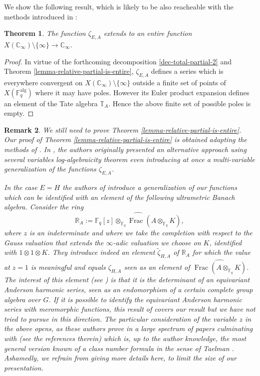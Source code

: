 \documentclass[11pt]{amsart}
\numberwithin{equation}{section}
\newcommand{\FF}{\mathbb{F}}
\newcommand{\CC}{\mathbb{C}}
\newcommand{\TT}{\mathbb{T}}
\newtheorem{Theorem}{Theorem}[section]
\newtheorem{Remark}[Theorem]{Remark}
\begin{document}
We show the following result, which is likely to be also reacheable with the methods introduced in \cite[\S 4.2]{ANG&NGO&TAV}:

\begin{Theorem}\label{zeta-E-A-are-entire}
The function $\zeta_{E,A}$ extends to an entire function $X(\CC_\infty)\setminus\{\infty\}\rightarrow\CC_\infty$.
\end{Theorem}


\begin{proof}%
In virtue of the forthcoming decomposition \eqref{dec-total-partial-2} and Theorem \ref{lemma-relative-partial-is-entire}, $\zeta_{E,A}$ defines a series which is everywhere convergent on $X(\CC_\infty)\setminus\{\infty\}$ outside a finite set of points of
$X(\FF_q^{\text{alg}})$ where it may have poles. However its Euler product expansion defines an element of the Tate algebra $\TT_A$. Hence the above finite set of possible poles is empty.
\end{proof}

\begin{Remark}{\em 
We still need to prove Theorem \ref{lemma-relative-partial-is-entire}. Our proof of
Theorem \ref{lemma-relative-partial-is-entire} is obtained adapting the methods of \cite[\S 8.9]{GOS}.
In \cite[\S 4.2]{ANG&NGO&TAV}, the authors originally presented an alternative approach using several variables log-algebraicity theorem even introducing at once a multi-variable generalization of the functions $\zeta_{E,A}$. 

In the case $E=H$ the authors of \cite{ANG&NGO&TAV} introduce a generalization of our functions which can be identified with an element of the following ultrametric Banach algebra. Consider the ring $$\mathbb{R}_{A}:=\widehat{\FF_q[z]\otimes_{\FF_q}\operatorname{Frac}(A\otimes_{\FF_q}K)},$$ where $z$ is an indeterminate and where we take the completion with respect to the Gauss valuation that extends the $\infty$-adic valuation we choose on $K$, identified with $1\otimes1\otimes K$. They introduce indeed an element $\tilde{\zeta}_{H,A}$ of $\mathbb{R}_{A}$ for which the value at $z=1$ is meaningful and equals $\zeta_{H,A}$ seen as an element of 
$\widehat{\operatorname{Frac}(A\otimes_{\FF_q}K)}$. The interest of this element (see \cite[Proposition 4.7]{ANG&NGO&TAV}) is that it is the determinant of an {\em equivariant Anderson harmonic series}, seen as an endomorphism of a certain complete group algebra over $G$. If it is possible to identify the equivariant Anderson harmonic series with meromorphic functions, this result of 
\cite{ANG&NGO&TAV} covers our result but we have not tried to pursue in this direction. The particular consideration of the variable $z$ in the above opens, as these authors prove in a large spectrum of papers culminating with \cite{ANG&NGO&TAV3} (see the references therein) which is, up to the author knowledge, the most general version known of a class number formula in the sense of Taelman \cite{TAE}. Ashamedly, we refrain from giving more details here,
to limit the size of our presentation.
}\end{Remark} 
\end{document}
